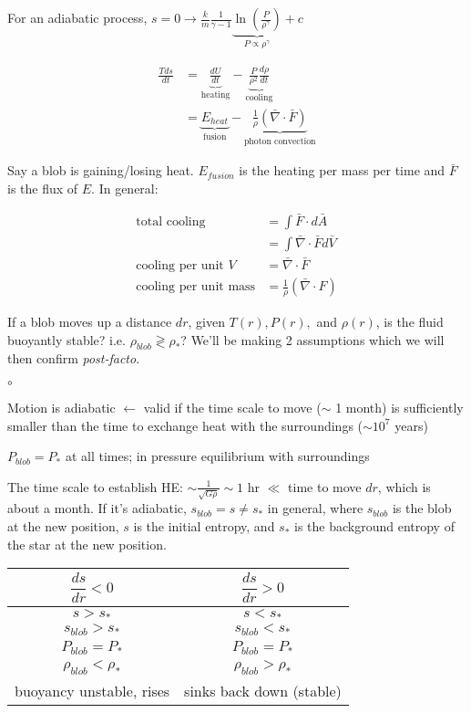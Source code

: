 \documentclass[10pt,letterpaper,final]{book}
\newcommand{\pt}{\propto}
\newcommand{\rp}{\right)}
\newcommand{\lp}{\left(}
\begin{document}
For an adiabatic process, $s=0 \rightarrow \frac{k}{m} \frac{1}{\gamma -1} \underbrace{\ln \lp \frac{P}{\rho^\gamma} \rp}_{P \pt \rho^\gamma} + c$

\begin{align}
\frac{Tds}{dt} &= \underbrace{\frac{dU}{dt}}_{\text{heating}} - \underbrace{\frac{P}{\rho^2}\frac{d\rho}{dt}}_{\text{cooling}}\\
&= \underbrace{E_{heat}}_{\text{fusion}} - \underbrace{\frac{1}{\rho}(\bar{\nabla} \cdot \bar{F})}_{\text{photon convection}}
\end{align}

Say a blob is gaining/losing heat. $E_{fusion}$ is the heating per mass per time and $\bar{F}$ is the flux of $E$. In general:

\begin{align}
\text{total cooling} &= \int \bar{F}\cdot d\bar{A}\\
&= \int \bar{\nabla} \cdot \bar{F} d\bar{V}\\
\text{cooling per unit $V$} &= \bar{\nabla} \cdot \bar{F}\\
\text{cooling per unit mass} &= \frac{1}{\rho}(\bar{\nabla} \cdot F)
\end{align}

If a blob moves up a distance $dr$, given $T(r), P(r),$ and $\rho(r)$, is the fluid buoyantly stable? i.e. $\rho_{blob} \gtrless \rho_*$? We'll be making 2 assumptions which we will then confirm \textit{post-facto}. 
\begin{list}{$\circ$}{}
\item Motion is adiabatic $\leftarrow$ valid if the time scale to move ($\sim$ 1 month) is sufficiently smaller than the time to exchange heat with the surroundings ($\sim10^7$ years)
\item $P_{blob} = P_*$ at all times; in pressure equilibrium with surroundings
\end{list}

The time scale to establish HE: $\sim\frac{1}{\sqrt{G\rho}} \sim 1 $ hr $\ll$ time to move $dr$, which is about a month. If it's adiabatic, $s_{blob} = s \ne s_*$ in general, where $s_{blob}$ is the blob at the new position, $s$ is the initial entropy, and $s_*$ is the background entropy of the star at the new position.\\

\begin{center}
\begin{tabular}{c|c}
\hline
$\dfrac{ds}{dr} < 0$ & $\dfrac{ds}{dr} > 0$\\ \hline
$s>s_*$ & $s < s_*$\\ \hline
$s_{blob} > s_*$ & $s_{blob}< s_*$\\ \hline
$P_{blob} = P_*$ & $P_{blob} = P_*$\\ \hline
$\rho_{blob} < \rho_*$ & $\rho_{blob} > \rho_*$ \\ \hline
buoyancy unstable, rises & sinks back down (stable)\\
\hline
\end{tabular}
\end{center}
\end{document}

